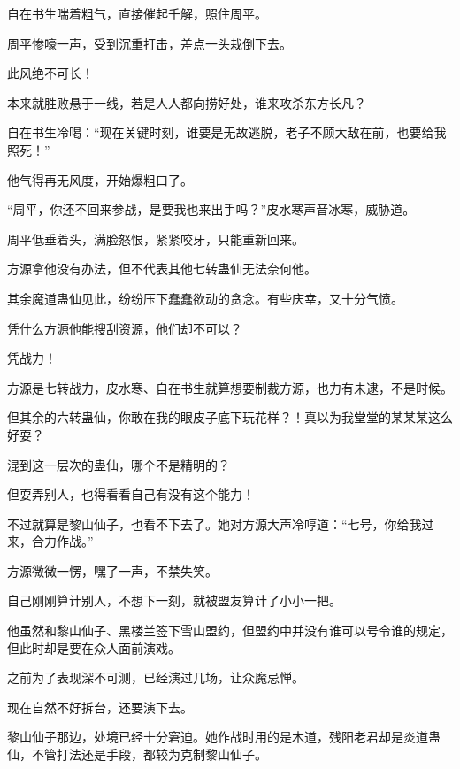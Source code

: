 \begin{this_body}
自在书生喘着粗气，直接催起千解，照住周平。

周平惨嚎一声，受到沉重打击，差点一头栽倒下去。

此风绝不可长！

本来就胜败悬于一线，若是人人都向捞好处，谁来攻杀东方长凡？

自在书生冷喝：“现在关键时刻，谁要是无故逃脱，老子不顾大敌在前，也要给我照死！”

他气得再无风度，开始爆粗口了。

“周平，你还不回来参战，是要我也来出手吗？”皮水寒声音冰寒，威胁道。

周平低垂着头，满脸怒恨，紧紧咬牙，只能重新回来。

方源拿他没有办法，但不代表其他七转蛊仙无法奈何他。

其余魔道蛊仙见此，纷纷压下蠢蠢欲动的贪念。有些庆幸，又十分气愤。

凭什么方源他能搜刮资源，他们却不可以？

凭战力！

方源是七转战力，皮水寒、自在书生就算想要制裁方源，也力有未逮，不是时候。

但其余的六转蛊仙，你敢在我的眼皮子底下玩花样？！真以为我堂堂的某某某这么好耍？

混到这一层次的蛊仙，哪个不是精明的？

但耍弄别人，也得看看自己有没有这个能力！

不过就算是黎山仙子，也看不下去了。她对方源大声冷哼道：“七号，你给我过来，合力作战。”

方源微微一愣，嘿了一声，不禁失笑。

自己刚刚算计别人，不想下一刻，就被盟友算计了小小一把。

他虽然和黎山仙子、黑楼兰签下雪山盟约，但盟约中并没有谁可以号令谁的规定，但此时却是要在众人面前演戏。

之前为了表现深不可测，已经演过几场，让众魔忌惮。

现在自然不好拆台，还要演下去。

黎山仙子那边，处境已经十分窘迫。她作战时用的是木道，残阳老君却是炎道蛊仙，不管打法还是手段，都较为克制黎山仙子。

\end{this_body}

